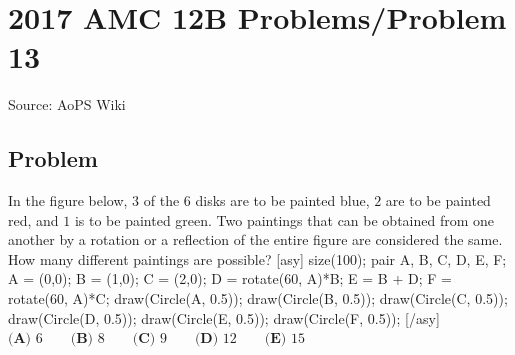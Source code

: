 \documentclass[12pt]{article}
\begin{document}
\section*{{2017 AMC 12B Problems/Problem 13}}
Source: AoPS Wiki

\subsection*{Problem}
In the figure below, $3$ of the $6$ disks are to be painted blue, $2$ are to be painted red, and $1$ is to be painted green. Two paintings that can be obtained from one another by a rotation or a reflection of the entire figure are considered the same. How many different paintings are possible? [asy] size(100); pair A, B, C, D, E, F; A = (0,0); B = (1,0); C = (2,0); D = rotate(60, A)*B; E = B + D; F = rotate(60, A)*C; draw(Circle(A, 0.5)); draw(Circle(B, 0.5)); draw(Circle(C, 0.5)); draw(Circle(D, 0.5)); draw(Circle(E, 0.5)); draw(Circle(F, 0.5)); [/asy] $\textbf{(A) } 6 \qquad \textbf{(B) } 8 \qquad \textbf{(C) } 9 \qquad \textbf{(D) } 12 \qquad \textbf{(E) } 15$
\end{document}
